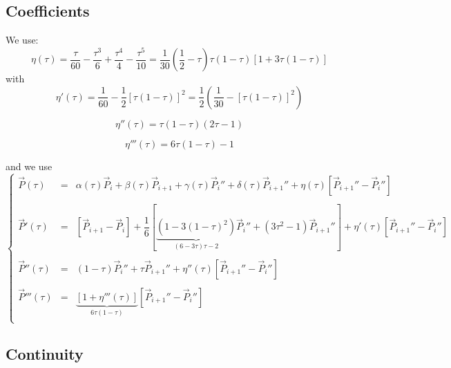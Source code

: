 \documentclass[aps,12pt]{revtex4}
\begin{document}
\subsection{Coefficients}
We use:
\begin{equation}
	\eta(\tau) = \dfrac{\tau}{60} - \dfrac{\tau^3}{6} + \dfrac{\tau^4}{4} - \dfrac{\tau^5}{10}
	 = \dfrac{1}{30} \left(\dfrac{1}{2} - \tau \right)\tau (1-\tau) \left[ 1 + 3 \tau(1-\tau) \right]
\end{equation}
with
\begin{equation}
\eta'(\tau) = \dfrac{1}{60} - \dfrac{1}{2} \left[ \tau(1-\tau) \right]^2 = \dfrac{1}{2}\left(\dfrac{1}{30} -  \left[ \tau(1-\tau) \right]^2\right)
\end{equation}

\begin{equation}
\eta''(\tau) =  \tau(1-\tau)(2\tau-1)
\end{equation}

\begin{equation}
\eta'''(\tau) =  6\tau(1-\tau)-1
\end{equation}

and we use
\begin{equation}
\left\lbrace
\begin{array}{rcl}
\vec{P}(\tau)  & = & \alpha(\tau)\vec{P}_i + \beta(\tau) \vec{P}_{i+1} + \gamma(\tau)\vec{P}_{i}'' + \delta(\tau) \vec{P}_{i+1}'' + \eta(\tau) \left[\vec{P}_{i+1}'' - \vec{P}_i''\right]\\
\\
\vec{P}'(\tau) & = & \left[\vec{P}_{i+1} - \vec{P}_i\right] + \dfrac{1}{6} \left[ \underbrace{(1-3(1-\tau)^2)}_{(6-3\tau)\tau-2} \vec{P}_{i}'' + (3\tau^2-1) \vec{P}_{i+1}'' \right] + \eta'(\tau) \left[\vec{P}_{i+1}'' - \vec{P}_i''\right]\\
\\
\vec{P}''(\tau) & = & (1-\tau) \vec{P}_{i}'' + \tau \vec{P}_{i+1}'' + \eta''(\tau) \left[\vec{P}_{i+1}'' - \vec{P}_i''\right]\\\
\\
\vec{P}'''(\tau) & = & \underbrace{\left[1+\eta'''(\tau)\right]}_{6\tau(1-\tau)} \left[\vec{P}_{i+1}'' - \vec{P}_i''\right]\\\
\end{array}
\right.
\end{equation}

\subsection{Continuity}
\end{document}
